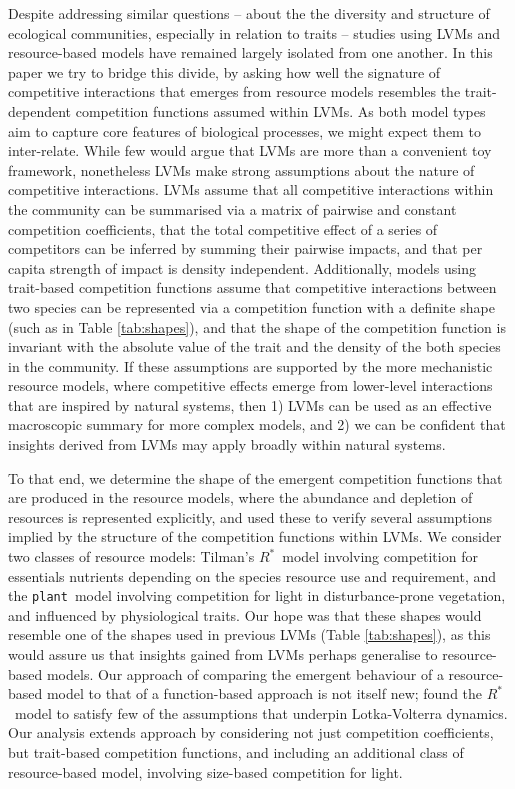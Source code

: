\documentclass[a4paper,11pt]{article}
\newcommand{\Rstar}{\ensuremath{R^*}}
\newcommand{\plant}{{\tt plant}}
\begin{document}
Despite addressing similar questions -- about the the diversity and structure of ecological communities, especially in relation to traits -- studies using LVMs and resource-based models have remained largely isolated from one another. In this paper we try to bridge this divide, by asking how well the signature of competitive interactions that emerges from resource models resembles the trait-dependent competition functions assumed within LVMs. As both model types aim to capture core features of biological processes, we might expect them to inter-relate. While few would argue that LVMs are more than a convenient toy framework, nonetheless LVMs make strong assumptions about the nature of competitive interactions. LVMs assume that all competitive interactions within the community can be summarised via a matrix of pairwise and constant competition coefficients, that the total competitive effect of a series of competitors can be inferred by summing their pairwise impacts, and that per capita strength of impact is density independent. Additionally, models using trait-based competition functions assume that competitive interactions between two species can be represented via a competition function with a definite shape (such as in Table \ref{tab:shapes}), and that the shape of the competition function is invariant with the absolute value of the trait and the density of the both species in the community. If these assumptions are supported by the more mechanistic resource models, where competitive effects emerge from lower-level interactions that are inspired by natural systems, then 1) LVMs can be used as an effective macroscopic summary for more complex models, and 2) we can be confident that insights derived from LVMs may apply broadly within natural systems. 

To that end, we determine the shape of the emergent competition functions that are produced in the resource models, where the abundance and depletion of resources is represented explicitly, and used these to verify several assumptions implied by the structure of the competition functions within LVMs. We consider two classes of resource models: Tilman's \Rstar\ model involving competition for essentials nutrients depending on the species resource use and requirement, and the \plant\ model involving competition for light in disturbance-prone vegetation, and influenced by physiological traits. Our hope was that these shapes would resemble one of the shapes used in previous LVMs (Table \ref{tab:shapes}), as this would assure us that insights gained from LVMs perhaps generalise to resource-based models. Our approach of comparing the emergent behaviour of a resource-based model to that of a function-based approach is not itself new; \citet{Abrams-2008} found the \Rstar\ model to satisfy few of the assumptions that underpin Lotka-Volterra dynamics. Our analysis extends \citeauthor{Abrams-2008} approach by considering not just competition coefficients, but trait-based competition functions, and including an additional class of resource-based model, involving size-based competition for light.
\end{document}
